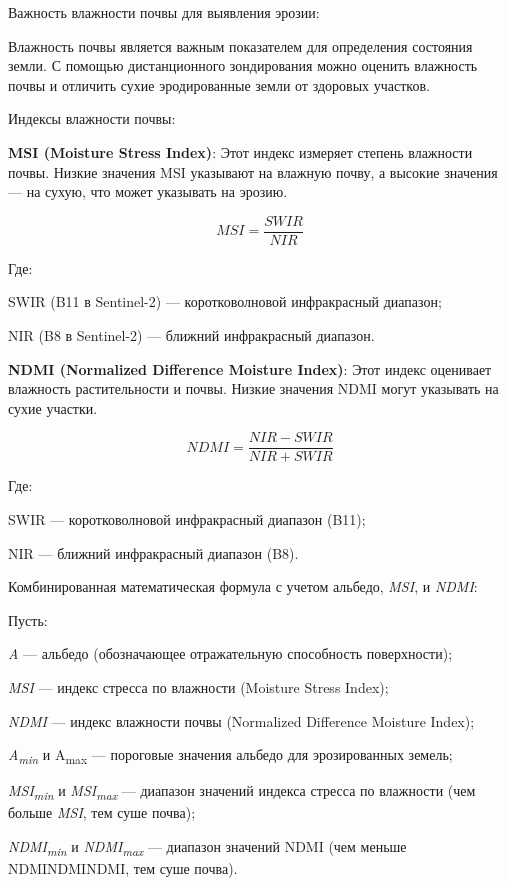 \begin{multicols}{2}
Важность влажности почвы для выявления эрозии:

Влажность почвы является важным показателем для определения состояния
земли. С помощью дистанционного зондирования можно оценить влажность
почвы и отличить сухие эродированные земли от здоровых участков.

Индексы влажности почвы:

{\bfseries MSI (Moisture Stress Index)}: Этот индекс измеряет степень
влажности почвы. Низкие значения MSI указывают на влажную почву, а
высокие значения --- на сухую, что может указывать на эрозию.

\begin{equation}
MSI = \frac{SWIR}{NIR}
\end{equation}

Где:

SWIR (B11 в Sentinel-2) --- коротковолновой инфракрасный диапазон;

NIR (B8 в Sentinel-2) --- ближний инфракрасный диапазон.

{\bfseries NDMI (Normalized Difference Moisture Index)}: Этот индекс
оценивает влажность растительности и почвы. Низкие значения NDMI могут
указывать на сухие участки.

\begin{equation}
NDMI = \frac{NIR - SWIR}{NIR + SWIR}
\end{equation}

Где:

SWIR --- коротковолновой инфракрасный диапазон (B11);

NIR --- ближний инфракрасный диапазон (B8).

Комбинированная математическая формула с учетом альбедо, \emph{MSI}, и
\emph{NDMI}:

Пусть:

\emph{A} --- альбедо (обозначающее отражательную способность
поверхности);

\emph{MSI} --- индекс стресса по влажности (Moisture Stress Index);

\emph{NDMI} --- индекс влажности почвы (Normalized Difference Moisture
Index);

\emph{A\textsubscript{min }}и A\textsubscript{max} --- пороговые
значения альбедо для эрозированных земель;

\emph{MSI\textsubscript{min }}и \emph{MSI\textsubscript{max}} ---
диапазон значений индекса стресса по влажности (чем больше \emph{MSI},
тем суше почва);

\emph{NDMI\textsubscript{min }}и \emph{NDMI\textsubscript{max}} ---
диапазон значений NDMI (чем меньше NDMINDMINDMI, тем суше почва).
\end{multicols}
